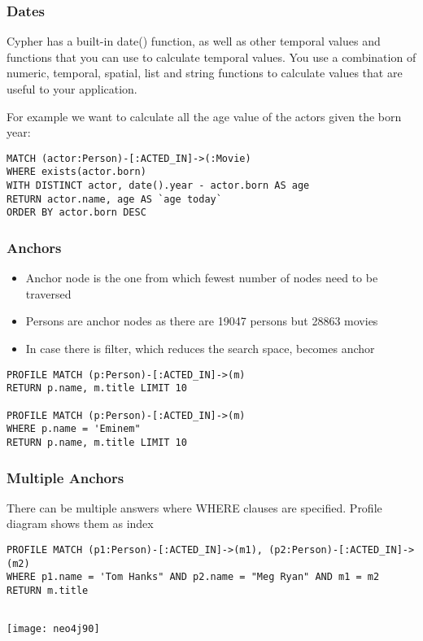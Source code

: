 \begin{frame}[fragile]\frametitle{Dates}

Cypher has a built-in date() function, as well as other temporal values and functions that you can use to calculate temporal values. You use a combination of numeric, temporal, spatial, list and string functions to calculate values that are useful to your application.

For example we want to calculate all the age value of the actors given the born year:

\begin{lstlisting}
MATCH (actor:Person)-[:ACTED_IN]->(:Movie)
WHERE exists(actor.born)
WITH DISTINCT actor, date().year - actor.born AS age
RETURN actor.name, age AS `age today`
ORDER BY actor.born DESC
\end{lstlisting}

\end{frame}





\begin{frame}[fragile]\frametitle{Anchors}

\begin{itemize}
\item Anchor node is the one from which fewest number of nodes need to be traversed
\item Persons are anchor nodes as there are 19047 persons but 28863 movies
\item In case there is filter, which reduces the search space, becomes anchor
\end{itemize}

\begin{lstlisting}
PROFILE MATCH (p:Person)-[:ACTED_IN]->(m)
RETURN p.name, m.title LIMIT 10

PROFILE MATCH (p:Person)-[:ACTED_IN]->(m)
WHERE p.name = 'Eminem"
RETURN p.name, m.title LIMIT 10
\end{lstlisting}



\end{frame}

\begin{frame}[fragile]\frametitle{Multiple Anchors}
There can be multiple answers where WHERE clauses are specified. Profile diagram shows them as index

\begin{lstlisting}
PROFILE MATCH (p1:Person)-[:ACTED_IN]->(m1), (p2:Person)-[:ACTED_IN]->(m2)
WHERE p1.name = 'Tom Hanks" AND p2.name = "Meg Ryan" AND m1 = m2
RETURN m.title


\end{lstlisting}

\begin{center}
\texttt{[image: neo4j90]}
\end{center}	  

\end{frame}


